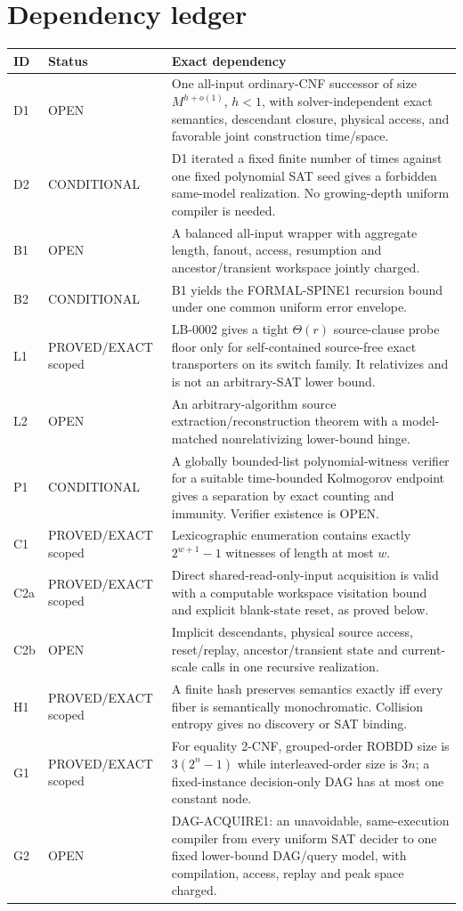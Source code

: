 \documentclass[11pt]{article}
\begin{document}
\section*{Dependency ledger}
\begin{longtable}{p{}p{}p{}}
\toprule ID&Status&Exact dependency\\\midrule\endhead
D1&OPEN&One all-input ordinary-CNF successor of size $M^{h+o(1)}$, $h<1$,
with solver-independent exact semantics, descendant closure, physical access,
and favorable joint construction time/space.\\
D2&CONDITIONAL&D1 iterated a fixed finite number of times against one fixed
polynomial SAT seed gives a forbidden same-model realization.  No growing-depth
uniform compiler is needed.\\
B1&OPEN&A balanced all-input wrapper with aggregate length, fanout, access,
resumption and ancestor/transient workspace jointly charged.\\
B2&CONDITIONAL&B1 yields the FORMAL-SPINE1 recursion bound under one common
uniform error envelope.\\
L1&PROVED/EXACT scoped&LB-0002 gives a tight $\Theta(r)$ source-clause probe
floor only for self-contained source-free exact transporters on its switch
family.  It relativizes and is not an arbitrary-SAT lower bound.\\
L2&OPEN&An arbitrary-algorithm source extraction/reconstruction theorem with a
model-matched nonrelativizing lower-bound hinge.\\
P1&CONDITIONAL&A globally bounded-list polynomial-witness verifier for a
suitable time-bounded Kolmogorov endpoint gives a separation by exact counting
and immunity.  Verifier existence is OPEN.\\
C1&PROVED/EXACT scoped&Lexicographic enumeration contains exactly
$2^{w+1}-1$ witnesses of length at most $w$.\\
C2a&PROVED/EXACT scoped&Direct shared-read-only-input acquisition is valid with
a computable workspace visitation bound and explicit blank-state reset, as
proved below.\\
C2b&OPEN&Implicit descendants, physical source access, reset/replay,
ancestor/transient state and current-scale calls in one recursive realization.\\
H1&PROVED/EXACT scoped&A finite hash preserves semantics exactly iff every
fiber is semantically monochromatic.  Collision entropy gives no discovery or
SAT binding.\\
G1&PROVED/EXACT scoped&For equality 2-CNF, grouped-order ROBDD size is
$3(2^n-1)$ while interleaved-order size is $3n$; a fixed-instance
decision-only DAG has at most one constant node.\\
G2&OPEN&\textsf{DAG-ACQUIRE1}: an unavoidable, same-execution compiler from
every uniform SAT decider to one fixed lower-bound DAG/query model, with
compilation, access, replay and peak space charged.\\
\bottomrule
\end{longtable}
\end{document}
